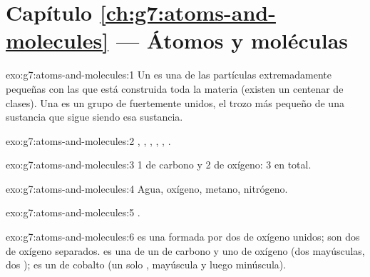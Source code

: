 \section*{Capítulo \ref{ch:g7:atoms-and-molecules} --- Átomos y moléculas}

\begin{solution}{exo:g7:atoms-and-molecules:1}
Un  es una de las partículas extremadamente pequeñas con las que
está construida toda la materia (existen un centenar de clases). Una
 es un grupo de  fuertemente unidos, el trozo más pequeño
de una sustancia que sigue siendo esa sustancia.
\end{solution}

\begin{solution}{exo:g7:atoms-and-molecules:2}
, , , , , .
\end{solution}

\begin{solution}{exo:g7:atoms-and-molecules:3}
1  de carbono y 2  de oxígeno: 3  en total.
\end{solution}

\begin{solution}{exo:g7:atoms-and-molecules:4}
Agua, oxígeno, metano, nitrógeno.
\end{solution}

\begin{solution}{exo:g7:atoms-and-molecules:5}
.
\end{solution}

\begin{solution}{exo:g7:atoms-and-molecules:6}
 es una  formada por dos  de oxígeno unidos;
 son dos  de oxígeno separados.  es una  de
un  de carbono y uno de oxígeno (dos mayúsculas, dos );
 es un  de cobalto (un solo , mayúscula y luego
minúscula).
\end{solution}

